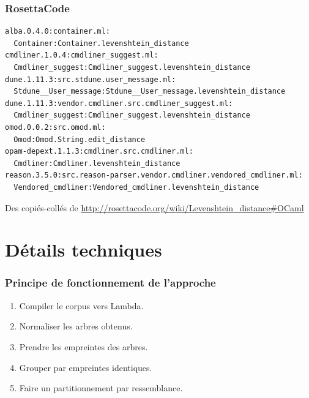 \documentclass[11pt]{beamer}
\begin{document}
\begin{frame}[fragile]
\frametitle{RosettaCode}
\begin{Verbatim}[fontsize=\footnotesize]
alba.0.4.0:container.ml:
  Container:Container.levenshtein_distance
cmdliner.1.0.4:cmdliner_suggest.ml:
  Cmdliner_suggest:Cmdliner_suggest.levenshtein_distance
dune.1.11.3:src.stdune.user_message.ml:
  Stdune__User_message:Stdune__User_message.levenshtein_distance
dune.1.11.3:vendor.cmdliner.src.cmdliner_suggest.ml:
  Cmdliner_suggest:Cmdliner_suggest.levenshtein_distance
omod.0.0.2:src.omod.ml:
  Omod:Omod.String.edit_distance
opam-depext.1.1.3:cmdliner.src.cmdliner.ml:
  Cmdliner:Cmdliner.levenshtein_distance
reason.3.5.0:src.reason-parser.vendor.cmdliner.vendored_cmdliner.ml:
  Vendored_cmdliner:Vendored_cmdliner.levenshtein_distance
\end{Verbatim}
Des copiés-collés de \url{http://rosettacode.org/wiki/Levenshtein_distance#OCaml}
\end{frame}

\section{Détails techniques}

\begin{frame}
\frametitle{Principe de fonctionnement de l'approche}
	\begin{enumerate}
	\item Compiler le corpus vers Lambda.
	\item Normaliser les arbres obtenus.
	\item Prendre les empreintes des arbres.
	\item Grouper par empreintes identiques.
	\item Faire un partitionnement par ressemblance.
\end{enumerate}
\end{frame}
\end{document}
